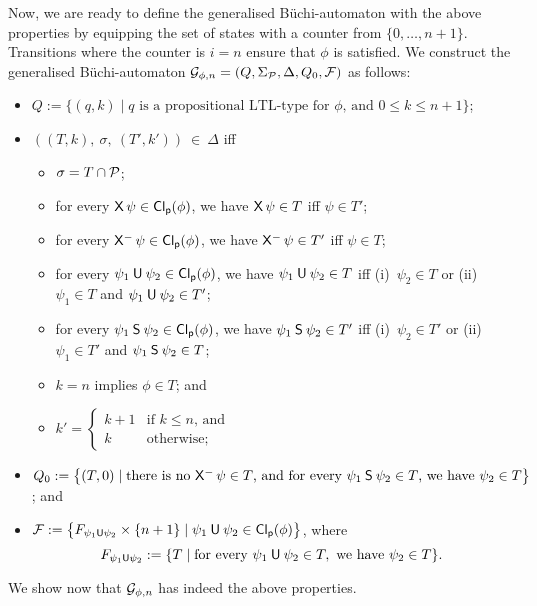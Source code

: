 Now, we are ready to define the generalised Büchi-automaton with the above
properties by equipping the set of states with a counter from $\{0,\dots,n+1\}$.
Transitions where the counter is $i=n$ ensure that $\phi$ is satisfied.  We
construct the generalised Büchi-automaton
$\mathcal{G}_{\phi,n}=(Q,\Sigma_\mathcal{P},\Delta,Q_0,\mathcal{F})$ as follows:
\begin{itemize}
    \item $Q:=\bigl\{(q,k)\mid%
            \text{$q$ is a propositional LTL-type for~$\phi$, and $0\le k\le n+1$}\bigr\}$;
    \item $((T,k),\ \sigma,\ (T',k'))\ \in\ \Delta$ iff
        \begin{itemize}
            \item $\sigma=T\cap\mathcal{P}$;
            \item for every $\operatorname{\mathsf{X}}\psi\in\operatorname{\mathsf{Cl_p}}(\phi)$, we have $\operatorname{\mathsf{X}}\psi\in
                T$ iff $\psi\in T'$;
            \item for every $\Previous\psi\in\PCl(\phi)$, we have
                $\Previous\psi\in T'$ iff $\psi\in T$;
            \item for every $\psi_1\mathbin{\mathsf{U}}\psi_2\in\operatorname{\mathsf{Cl_p}}(\phi)$, we have
                $\psi_1\mathbin{\mathsf{U}}\psi_2\in T$ iff (i)~$\psi_2\in T$ or
                (ii)~$\psi_1\in T$ and $\psi_1\mathbin{\mathsf{U}}\psi_2\in T'$;
            \item for every $\psi_1\mathbin{\mathsf{S}}\psi_2\in\operatorname{\mathsf{Cl_p}}(\phi)$, we have
                $\psi_1\mathbin{\mathsf{S}}\psi_2\in T'$ iff (i)~$\psi_2\in T'$ or
                (ii)~$\psi_1\in T'$ and $\psi_1\mathbin{\mathsf{S}}\psi_2\in T$;
            \item $k=n$ implies $\phi\in T$; and
            \item $k'=\begin{cases}
                    k+1 &\text{if $k\le n$, and}\\
                    k   &\text{otherwise;}
                \end{cases}$
        \end{itemize}
    \item $Q_0:=\bigl\{(T,0)\mid\text{there is no $\Previous\psi\in T$, and %
            for every $\psi_1\Since\psi_2\in T$, we have $\psi_2\in T$}\bigr\}$; and
    \item
        $\Fmc:=\bigl\{F_{\psi_1\Until\psi_2}\times\{n+1\}\mid%
            \psi_1\Until\psi_2\in\PCl(\phi)\bigr\}$, where
        \[F_{\psi_1\mathbin{\mathsf{U}}\psi_2}:=\{T\mid\text{for every}\
            \psi_1\mathbin{\mathsf{U}}\psi_2\in T,\ \text{we have}\ \psi_2\in T\}.\]
\end{itemize}
%
We show now that $\mathcal{G}_{\phi,n}$ has indeed the above properties.

